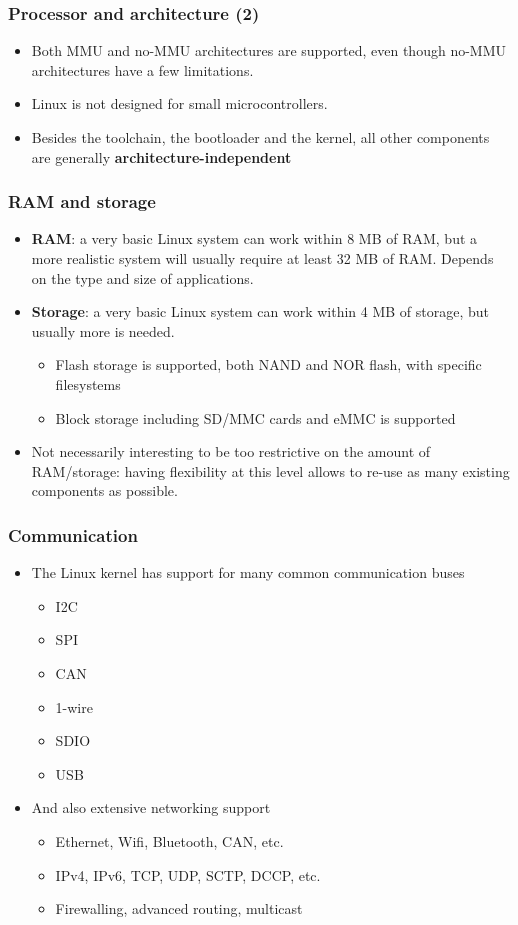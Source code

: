 \begin{frame}
  \frametitle{Processor and architecture (2)}
  \begin{itemize}
  \item Both MMU and no-MMU architectures are supported, even though
    no-MMU architectures have a few limitations.
  \item Linux is not designed for small microcontrollers.
  \item Besides the toolchain, the bootloader and the kernel, all
    other components are generally {\bf architecture-independent}
  \end{itemize}
\end{frame}

\begin{frame}
  \frametitle{RAM and storage}
  \begin{itemize}
  \item {\bf RAM}: a very basic Linux system can work within 8 MB of
    RAM, but a more realistic system will usually require at least 32
    MB of RAM. Depends on the type and size of applications.
  \item {\bf Storage}: a very basic Linux system can work within 4 MB
    of storage, but usually more is needed.
    \begin{itemize}
    \item Flash storage is supported, both NAND and NOR flash, with
      specific filesystems
    \item Block storage including SD/MMC cards and eMMC is supported
    \end{itemize}
  \item Not necessarily interesting to be too restrictive on the
    amount of RAM/storage: having flexibility at this level allows to
    re-use as many existing components as possible.
  \end{itemize}
\end{frame}

\begin{frame}
  \frametitle{Communication}
  \begin{itemize}
  \item The Linux kernel has support for many common communication
    buses
    \begin{itemize}
    \item I2C
    \item SPI
    \item CAN
    \item 1-wire
    \item SDIO
    \item USB
    \end{itemize}
  \item And also extensive networking support
    \begin{itemize}
    \item Ethernet, Wifi, Bluetooth, CAN, etc.
    \item IPv4, IPv6, TCP, UDP, SCTP, DCCP, etc.
    \item Firewalling, advanced routing, multicast
    \end{itemize}
  \end{itemize}
\end{frame}

